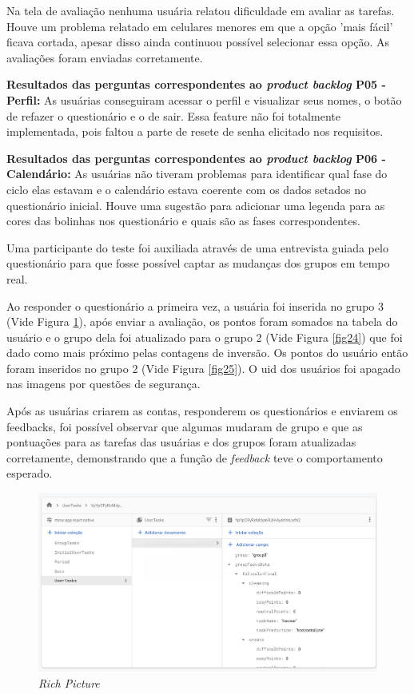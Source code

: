 Na tela de avaliação nenhuma usuária relatou dificuldade em avaliar as tarefas. Houve um problema relatado 
em celulares menores em que a opção 'mais fácil' ficava cortada, apesar disso ainda continuou possível selecionar 
essa opção. As avaliações foram enviadas corretamente.

\textbf{Resultados das perguntas correspondentes ao \emph{product backlog} P05 - Perfil:} As usuárias conseguiram acessar o perfil 
e visualizar seus nomes, o botão de refazer o questionário e o de sair. Essa feature não foi totalmente implementada, pois faltou a 
parte de resete de senha elicitado nos requisitos.

\textbf{Resultados das perguntas correspondentes ao \emph{product backlog} P06 - Calendário:} As usuárias não tiveram problemas 
para identificar qual fase do ciclo elas estavam e o calendário estava coerente com os dados setados no questionário inicial.
Houve uma sugestão para adicionar uma legenda para as cores das bolinhas nos questionário e quais são as fases correspondentes. 

Uma participante do teste foi auxiliada através de uma entrevista guiada pelo 
questionário para que fosse possível captar as mudanças dos grupos em tempo real. 

Ao responder o questionário a primeira vez, a usuária foi inserida no grupo 3 (Vide Figura \ref{fig23}), 
após enviar a avaliação, os pontos foram somados 
na tabela do usuário e o grupo dela foi atualizado para o grupo 2 (Vide Figura \ref{fig24}) 
que foi dado como mais próximo pelas contagens de inversão. 
Os pontos do usuário então foram inseridos no grupo 2 (Vide Figura \ref{fig25}). O uid dos usuários foi apagado nas 
imagens por questões de segurança.

Após as usuárias criarem as contas, responderem os questionários e enviarem os feedbacks, foi possível observar que algumas 
mudaram de grupo e que as pontuações para as tarefas das usuárias e dos grupos foram atualizadas corretamente, demonstrando que 
a função de \emph{feedback} teve o comportamento esperado. 

\begin{figure}[ht]
    \centering
    \includegraphics[keepaspectratio=true,scale=0.18]{figuras/db1.jpeg}
    \caption{\emph{Rich Picture}}
        \label{fig23}
\end{figure}

